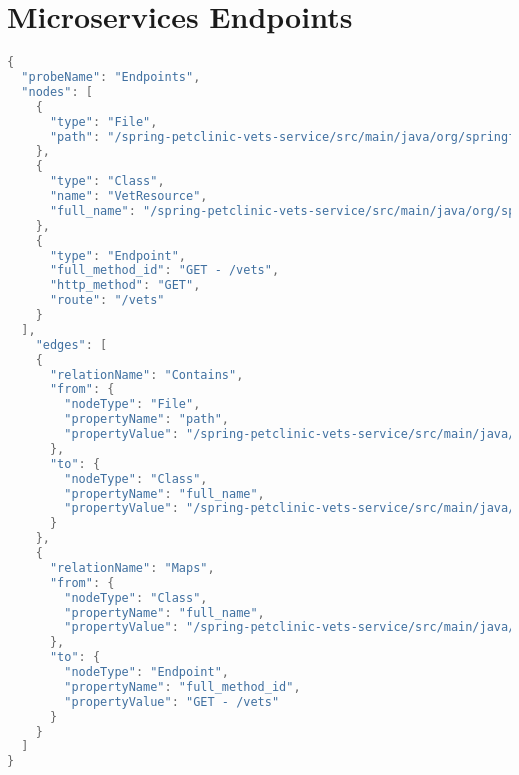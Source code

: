 \section{Microservices Endpoints}\label{appendix_sec:microservices_endpoints}
\begin{lstlisting}[language=java]
{
  "probeName": "Endpoints",
  "nodes": [
    {
      "type": "File",
      "path": "/spring-petclinic-vets-service/src/main/java/org/springframework/samples/petclinic/vets/web/VetResource.java"
    },
    {
      "type": "Class",
      "name": "VetResource",
      "full_name": "/spring-petclinic-vets-service/src/main/java/org/springframework/samples/petclinic/vets/web/VetResource.java:VetResource"
    },
    {
      "type": "Endpoint",
      "full_method_id": "GET - /vets",
      "http_method": "GET",
      "route": "/vets"
    }
  ],
    "edges": [
    {
      "relationName": "Contains",
      "from": {
        "nodeType": "File",
        "propertyName": "path",
        "propertyValue": "/spring-petclinic-vets-service/src/main/java/org/springframework/samples/petclinic/vets/web/VetResource.java"
      },
      "to": {
        "nodeType": "Class",
        "propertyName": "full_name",
        "propertyValue": "/spring-petclinic-vets-service/src/main/java/org/springframework/samples/petclinic/vets/web/VetResource.java:VetResource"
      }
    },
    {
      "relationName": "Maps",
      "from": {
        "nodeType": "Class",
        "propertyName": "full_name",
        "propertyValue": "/spring-petclinic-vets-service/src/main/java/org/springframework/samples/petclinic/vets/web/VetResource.java:VetResource"
      },
      "to": {
        "nodeType": "Endpoint",
        "propertyName": "full_method_id",
        "propertyValue": "GET - /vets"
      }
    }
  ]
}
\end{lstlisting}

